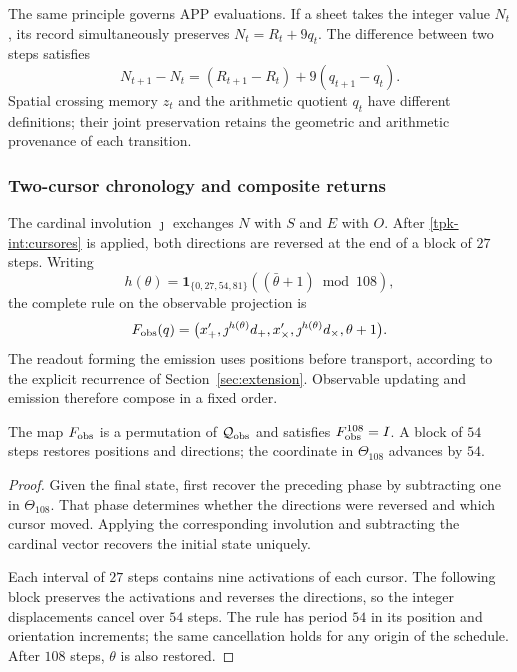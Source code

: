 The same principle governs APP evaluations. If a sheet takes the
integer value \(N_t\), its record simultaneously preserves
\(N_t=R_t+9q_t\). The difference between two steps satisfies
\[
 N_{t+1}-N_t=(R_{t+1}-R_t)+9(q_{t+1}-q_t).
\]
Spatial crossing memory \(z_t\) and the arithmetic quotient \(q_t\)
have different definitions; their joint preservation retains the geometric
and arithmetic provenance of each transition.

\subsubsection{Two-cursor chronology and composite returns}
\label{tpk-int:cronologia}

The cardinal involution \(\jmath\) exchanges \(N\) with \(S\) and
\(E\) with \(O\). After \eqref{tpk-int:cursores} is applied, both
directions are reversed at the end of a block of \(27\) steps.
Writing
\[
 h(\theta)=\mathbf1_{\{0,27,54,81\}}
             ((\bar\theta+1)\bmod108),
\]
the complete rule on the observable projection is
\begin{equation}
 F_{\rm obs}(q)=
 \bigl(x_+',\jmath^{h(\theta)}d_+,
       x_\times',\jmath^{h(\theta)}d_\times,
       \theta+1\bigr).
 \label{tpk-int:fobs}
\end{equation}
The readout forming the emission uses positions before
transport, according to the explicit recurrence of
Section~\ref{sec:extension}. Observable updating and emission
therefore compose in a fixed order.

\begin{proposition}
\label{tpk-int:periodo}
The map \(F_{\rm obs}\) is a permutation of
\(\mathcal Q_{\rm obs}\) and satisfies \(F_{\rm obs}^{108}=I\).
A block of \(54\) steps restores positions and directions;
the coordinate in \(\Theta_{108}\) advances by \(54\).
\end{proposition}
\begin{proof}
Given the final state, first recover the preceding phase by subtracting one
in \(\Theta_{108}\). That phase determines whether the
directions were reversed and which cursor moved. Applying the corresponding involution
and subtracting the cardinal vector recovers the initial state uniquely.

Each interval of \(27\) steps contains nine activations of each
cursor. The following block preserves the activations and reverses the
directions, so the integer displacements cancel over
\(54\) steps. The rule has period \(54\) in its position and
orientation increments; the same cancellation holds for any origin
of the schedule. After \(108\) steps, \(\theta\) is also restored.
\end{proof}

